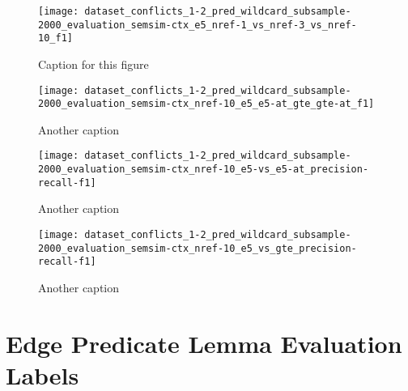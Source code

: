 \begin{figure}[htp]
\centering
\texttt{[image: dataset\_conflicts\_1-2\_pred\_wildcard\_subsample-2000\_evaluation\_semsim-ctx\_e5\_nref-1\_vs\_nref-3\_vs\_nref-10\_f1]}
\caption{Caption for this figure}
\label{fig:unique-label-2}
\end{figure}

\begin{figure}[htp]
\centering
\texttt{[image: dataset\_conflicts\_1-2\_pred\_wildcard\_subsample-2000\_evaluation\_semsim-ctx\_nref-10\_e5\_e5-at\_gte\_gte-at\_f1]}
\caption{Another caption}
\label{fig:unique-label-5}
\end{figure}


\begin{figure}[htp]
\centering
\texttt{[image: dataset\_conflicts\_1-2\_pred\_wildcard\_subsample-2000\_evaluation\_semsim-ctx\_nref-10\_e5-vs\_e5-at\_precision-recall-f1]}
\caption{Another caption}
\label{fig:unique-label-3}
\end{figure}

\begin{figure}[htp]
\centering
\texttt{[image: dataset\_conflicts\_1-2\_pred\_wildcard\_subsample-2000\_evaluation\_semsim-ctx\_nref-10\_e5\_vs\_gte\_precision-recall-f1]}
\caption{Another caption}
\label{fig:unique-label-4}
\end{figure}


\newpage
\section{Edge Predicate Lemma Evaluation Labels}
\label{app-sec:edge-eval-labels}

